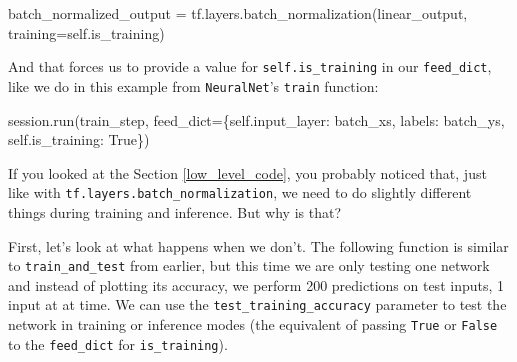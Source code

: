 \documentclass[11pt]{article}
\newenvironment{Shaded}{}{}
\newcommand{\NormalTok}[1]{{#1}}
\newcommand{\VariableTok}[1]{\textcolor[rgb]{0.10,0.09,0.49}{{#1}}}
\newcommand{\OperatorTok}[1]{\textcolor[rgb]{0.40,0.40,0.40}{{#1}}}
\begin{document}
\begin{Shaded}
\begin{Highlighting}[]
\NormalTok{batch_normalized_output }\OperatorTok{=}\NormalTok{ tf.layers.batch_normalization(linear_output, training}\OperatorTok{=}\VariableTok{self}\NormalTok{.is_training)}
\end{Highlighting}
\end{Shaded}

And that forces us to provide a value for \texttt{self.is\_training} in
our \texttt{feed\_dict}, like we do in this example from
\texttt{NeuralNet}'s \texttt{train} function:

\begin{Shaded}
\begin{Highlighting}[]
\NormalTok{session.run(train_step, feed_dict}\OperatorTok{=}\NormalTok{\{}\VariableTok{self}\NormalTok{.input_layer: batch_xs, }
\NormalTok{                                   labels: batch_ys, }
                                   \VariableTok{self}\NormalTok{.is_training: }\VariableTok{True}\NormalTok{\})}
\end{Highlighting}
\end{Shaded}

If you looked at the Section \ref{low_level_code}, you probably noticed
that, just like with \texttt{tf.layers.batch\_normalization}, we need to
do slightly different things during training and inference. But why is
that?

First, let's look at what happens when we don't. The following function
is similar to \texttt{train\_and\_test} from earlier, but this time we
are only testing one network and instead of plotting its accuracy, we
perform 200 predictions on test inputs, 1 input at at time. We can use
the \texttt{test\_training\_accuracy} parameter to test the network in
training or inference modes (the equivalent of passing \texttt{True} or
\texttt{False} to the \texttt{feed\_dict} for \texttt{is\_training}).
\end{document}
